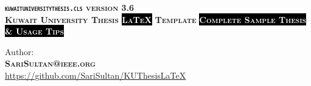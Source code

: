 \thispagestyle{empty}
\mbox{} \vfil
\begin{center}
	\scshape
	{\hspace{2.5cm} \mbox{} \vspace{-10pt} \bfseries  \texttt{kuwaituniversitythesis.cls} version {\Large 3.6}} \\
	
	
{\fontsize{82pt}{2pt} \bfseries Kuwait University Thesis \colorbox{black}{\textcolor{white}{\LaTeX}} Template}
{\fontsize{22pt}{2pt} \bfseries  \colorbox{black}{\textcolor{white}{Complete Sample Thesis \& Usage Tips}}  }





{Author: }\\
{\scshape \fontsize{16}{2pt}  \bfseries SariSultan@ieee.org}\\
{ \fontsize{12}{2pt} \normalfont \href{https://github.com/SariSultan/KUThesisLaTeX}{https://github.com/SariSultan/KUThesisLaTeX}}



\end{center}

